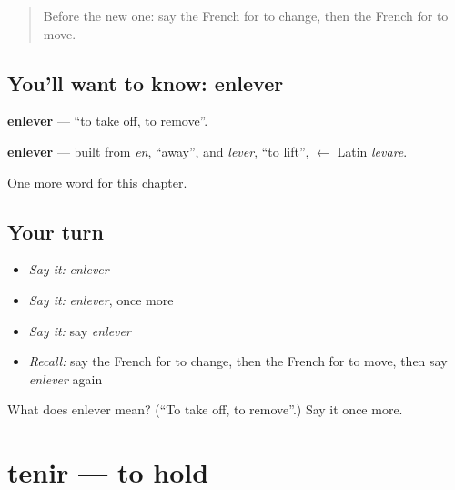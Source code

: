 \label{lesson:FR-C176-enlever}



\begin{quote}
Before the new one: say the French for to change, then the French for to move.
\end{quote}

\subsection*{You'll want to know: enlever}
\textbf{enlever} — \textquotedblleft{}to take off, to remove\textquotedblright{}.

\begin{cousinweb}
\textbf{enlever} — built from \emph{en}, \textquotedblleft{}away\textquotedblright{}, and \emph{lever}, \textquotedblleft{}to lift\textquotedblright{}, $\leftarrow$ Latin \emph{levare}.
\end{cousinweb}

\begin{grammarlens}[title={What you've built}]
One more word for this chapter.
\end{grammarlens}

\subsection*{Your turn}
\begin{itemize}
\raggedright
  \item \emph{Say it:} \emph{enlever}
  \item \emph{Say it:} \emph{enlever}, once more
  \item \emph{Say it:} say \emph{enlever}
  \item \emph{Recall:} say the French for to change, then the French for to move, then say \emph{enlever} again
\end{itemize}

\begin{tcolorbox}[breakable,colback=teal!4,colframe=teal!35!black,title={Before you move on}]
What does enlever mean? (\textquotedblleft{}To take off, to remove\textquotedblright{}.) Say it once more.
\end{tcolorbox}
\section[tenir]{tenir — to hold}

\label{lesson:FR-C176-tenir}



